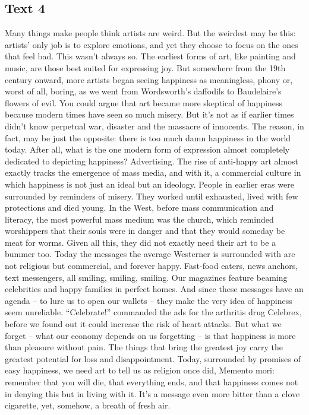 \subsection{Text 4}
Many things make people think artists are weird. But the weirdest may be this: artists’ only job is to explore emotions, and yet they choose to focus on the ones that feel bad.
This wasn’t always so. The earliest forms of art, like painting and music, are those best suited for expressing joy. But somewhere from the 19th century onward, more artists began seeing happiness as meaningless, phony or, worst of all, boring, as we went from Wordsworth’s daffodils to Baudelaire’s flowers of evil.
You could argue that art became more skeptical of happiness because modern times have seen so much misery. But it’s not as if earlier times didn’t know perpetual war, disaster and the massacre of innocents. The reason, in fact, may be just the opposite: there is too much damn happiness in the world today.
After all, what is the one modern form of expression almost completely dedicated to depicting happiness? Advertising. The rise of anti-happy art almost exactly tracks the emergence of mass media, and with it, a commercial culture in which happiness is not just an ideal but an ideology.
People in earlier eras were surrounded by reminders of misery. They worked until exhausted, lived with few protections and died young. In the West, before mass communication and literacy, the most powerful mass medium was the church, which reminded worshippers that their souls were in danger and that they would someday be meat for worms. Given all this, they did not exactly need their art to be a bummer too.
Today the messages the average Westerner is surrounded with are not religious but commercial, and forever happy. Fast-food eaters, news anchors, text messengers, all smiling, smiling, smiling. Our magazines feature beaming celebrities and happy families in perfect homes. And since these messages have an agenda -- to lure us to open our wallets -- they make the very idea of happiness seem unreliable. “Celebrate!” commanded the ads for the arthritis drug Celebrex, before we found out it could increase the risk of heart attacks.
But what we forget -- what our economy depends on us forgetting -- is that happiness is more than pleasure without pain. The things that bring the greatest joy carry the greatest potential for loss and disappointment. Today, surrounded by promises of easy happiness, we need art to tell us as religion once did, Memento mori: remember that you will die, that everything ends, and that happiness comes not in denying this but in living with it. It’s a message even more bitter than a clove cigarette, yet, somehow, a breath of fresh air.

